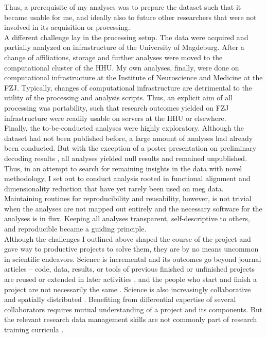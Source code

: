 Thus, a prerequisite of my analyses was to prepare the dataset such that it became usable for me, and ideally also to future other researchers that were not involved in its acquisition or processing.\\
A different challenge lay in the processing setup.
The data were acquired and partially analyzed on infrastructure of the University of Magdeburg.
After a change of affiliations, storage and further analyses were moved to the computational cluster of the \gls{HHU}.
My own analyses, finally, were done on computational infrastructure at the Institute of Neuroscience and Medicine at the \gls{FZJ}.
Typically, changes of computational infrastructure are detrimental to the utility of the processing and analysis scripts.
Thus, an explicit aim of all processing was portability, such that research outcomes yielded on \gls{FZJ} infrastructure were readily usable on servers at the \gls{HHU} or elsewhere.\\
Finally, the to-be-conducted analyses were highly exploratory.
Although the dataset had not been published before, a large amount of analyses had already been conducted.
But with the exception of a poster presentation on preliminary decoding results \citep{kaiserposter}, all analyses yielded null results and remained unpublished.
Thus, in an attempt to search for remaining insights in the data with novel methodology, I set out to conduct analysis rooted in functional alignment and dimensionality reduction that have yet rarely been used on \gls{meg} data.
Maintaining routines for reproducibility and reusability, however, is not trivial when the analyses are not mapped out entirely and the necessary software for the analyses is in flux.
Keeping all analyses transparent, self-descriptive to others, and reproducible became a guiding principle.\\
Although the challenges I outlined above shaped the course of the project and gave way to productive projects to solve them, they are by no means uncommon in scientific endeavors.
Science is incremental and its outcomes go beyond journal articles -- code, data, results, or tools of previous finished or unfinished projects are reused or extended in later activities \citep{mons2018data}, and the people who start and finish a project are not necessarily the same \citep{puce2017review}.
Science is also increasingly collaborative and spatially distributed \citep{csomos2020exploring}.
Benefiting from differential expertise of several collaborators requires mutual understanding of a project and its components.
But the relevant research data management skills are not commonly part of research training curricula \citep{grisham2016proposed}. %
